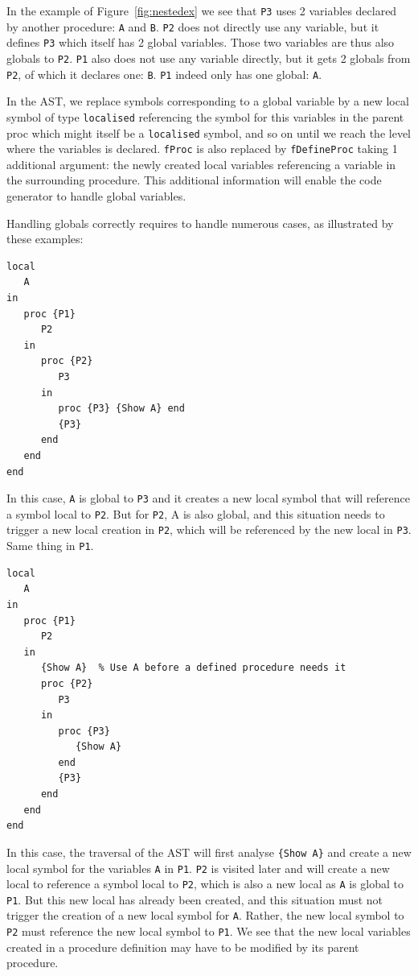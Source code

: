 \documentclass[a4paper]{memoir}
\begin{document}
In the example of Figure~\ref{fig:nestedex} we see that \lstinline!P3! uses 2 variables declared by another procedure: \lstinline!A! and \lstinline!B!. 
\lstinline!P2! does not directly use any variable, but it defines \lstinline!P3! which itself has 2 global variables. Those two variables are thus also globals to \lstinline!P2!.
\lstinline!P1! also does not use any variable directly, but it gets 2 globals from \lstinline!P2!, of which it declares one: \lstinline!B!. \lstinline!P1! indeed only has one global: \lstinline!A!.

In the AST, we replace symbols corresponding to a global
variable by a new local symbol of type \lstinline!localised! referencing the
symbol for this variables in the parent proc which might itself be a
\lstinline!localised! symbol, and so on until we reach the level where the variables is declared.
\lstinline!fProc! is also replaced by
\lstinline!fDefineProc! taking 1 additional argument: the newly created local
variables referencing a variable in the surrounding procedure. This additional
information will enable the code generator to handle global variables.

Handling globals correctly requires to handle numerous cases, as illustrated by these examples:

\begin{lstlisting}
local
   A
in
   proc {P1}
      P2
   in
      proc {P2}
         P3
      in
         proc {P3} {Show A} end
         {P3}
      end
   end
end
\end{lstlisting}
In this case, \lstinline!A! is global to \lstinline!P3! and it creates a new local symbol that will reference a symbol local to \lstinline!P2!. But for \lstinline!P2!, A is also global, and this situation needs to trigger a new local creation in \lstinline!P2!, which will be referenced by the new local in \lstinline!P3!. Same thing in \lstinline!P1!.

\begin{lstlisting}
local
   A
in
   proc {P1}
      P2
   in
      {Show A}  % Use A before a defined procedure needs it
      proc {P2}
         P3
      in
         proc {P3}
            {Show A}
         end
         {P3}
      end
   end
end
\end{lstlisting}

In this case, the traversal of the AST will first analyse \lstinline!{Show A}! and create a new local symbol for the variables \lstinline!A! in \lstinline!P1!. \lstinline!P2! is visited later and will create a new local to reference a symbol local to \lstinline!P2!, which is also a new local as \lstinline!A! is global to \lstinline!P1!. But this new local has already been created, and this situation must not trigger the creation of a new local symbol for \lstinline!A!. Rather, the new local symbol to \lstinline!P2! must reference the new local symbol to \lstinline!P1!. We see that the new local variables created in a procedure definition may have to be modified by its parent procedure.
\end{document}

